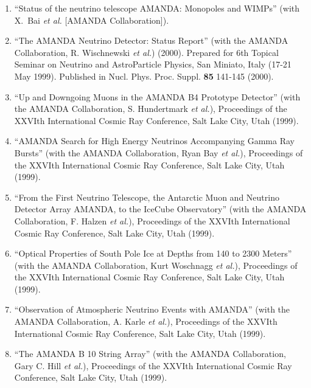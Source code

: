 \begin{enumerate}
\item ``Status of the neutrino telescope AMANDA: Monopoles
        and WIMPs'' (with X.~Bai {\it et al.}  [AMANDA
        Collaboration]). %

\item ``The AMANDA Neutrino Detector: Status Report'' (with
        the AMANDA   Collaboration, R. Wischnewski {\it et
        al.}) (2000).  Prepared for 6th   Topical Seminar on
        Neutrino and AstroParticle Physics, San Miniato,
        Italy (17-21 May 1999).  Published in Nucl. Phys.
        Proc. Suppl. {\bf     85} 141-145 (2000).

\item ``Up and Downgoing Muons in the AMANDA B4 Prototype
        Detector'' (with   the AMANDA Collaboration, S.
        Hundertmark {\it et al.}), Proceedings of the
        XXVIth International Cosmic Ray Conference, Salt
        Lake City, Utah   (1999).

\item ``AMANDA Search for High Energy Neutrinos Accompanying
        Gamma Ray   Bursts'' (with the AMANDA Collaboration,
        Ryan Bay {\it et al.}), Proceedings   of the XXVIth
        International Cosmic Ray Conference, Salt Lake City,
        Utah (1999).

\item ``From the First Neutrino Telescope, the Antarctic
        Muon and   Neutrino Detector Array AMANDA, to the
        IceCube Observatory'' (with the   AMANDA
        Collaboration, F. Halzen {\it et al.}), Proceedings
        of the XXVIth   International Cosmic Ray Conference,
        Salt Lake City, Utah (1999).

\item ``Optical Properties of South Pole Ice at Depths from
        140 to 2300   Meters'' (with the AMANDA
        Collaboration, Kurt Woschnagg {\it et al.}),
        Proceedings of the XXVIth International Cosmic Ray
        Conference, Salt   Lake City, Utah (1999).

\item ``Observation of Atmospheric Neutrino Events with
        AMANDA'' (with the   AMANDA Collaboration, A. Karle
        {\it et al.}), Proceedings of the XXVIth
        International Cosmic Ray Conference, Salt Lake City,
        Utah (1999).

\item ``The AMANDA B 10 String Array'' (with the AMANDA
        Collaboration,   Gary C. Hill {\it et al.}),
        Proceedings of the XXVIth International Cosmic   Ray
        Conference, Salt Lake City, Utah (1999).


\end{enumerate}
